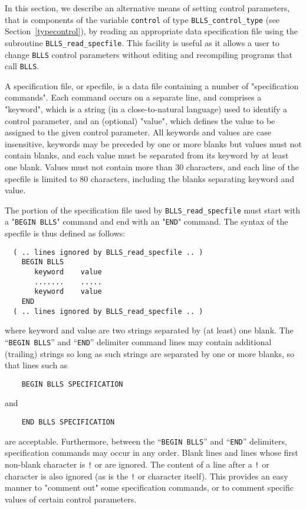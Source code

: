 \documentclass{galahad}
\newcommand{\packagename}{BLLS}
\begin{document}

\galfeatures
\noindent In this section, we describe an alternative means of setting
control parameters, that is components of the variable {\tt control} of type
{\tt \packagename\_control\_type}
(see Section~\ref{typecontrol}),
by reading an appropriate data specification file using the
subroutine {\tt \packagename\_read\_specfile}. This facility
is useful as it allows a user to change  {\tt \packagename} control parameters
without editing and recompiling programs that call {\tt \packagename}.

A specification file, or specfile, is a data file containing a number of
"specification commands". Each command occurs on a separate line,
and comprises a "keyword",
which is a string (in a close-to-natural language) used to identify a
control parameter, and
an (optional) "value", which defines the value to be assigned to the given
control parameter. All keywords and values are case insensitive,
keywords may be preceded by one or more blanks but
values must not contain blanks, and
each value must be separated from its keyword by at least one blank.
Values must not contain more than 30 characters, and
each line of the specfile is limited to 80 characters,
including the blanks separating keyword and value.



The portion of the specification file used by
{\tt \packagename\_read\_specfile}
must start
with a "{\tt BEGIN \packagename}" command and end with an
"{\tt END}" command.  The syntax of the specfile is thus defined as follows:
\begin{verbatim}
  ( .. lines ignored by BLLS_read_specfile .. )
    BEGIN BLLS
       keyword    value
       .......    .....
       keyword    value
    END
  ( .. lines ignored by BLLS_read_specfile .. )
\end{verbatim}
where keyword and value are two strings separated by (at least) one blank.
The ``{\tt BEGIN \packagename}'' and ``{\tt END}'' delimiter command lines
may contain additional (trailing) strings so long as such strings are
separated by one or more blanks, so that lines such as
\begin{verbatim}
    BEGIN BLLS SPECIFICATION
\end{verbatim}
and
\begin{verbatim}
    END BLLS SPECIFICATION
\end{verbatim}
are acceptable. Furthermore,
between the
``{\tt BEGIN \packagename}'' and ``{\tt END}'' delimiters,
specification commands may occur in any order.  Blank lines and
lines whose first non-blank character is {\tt !} or {\tt *} are ignored.
The content
of a line after a {\tt !} or {\tt *} character is also
ignored (as is the {\tt !} or {\tt *}
character itself). This provides an easy manner to "comment out" some
specification commands, or to comment specific values
of certain control parameters.
\end{document}
